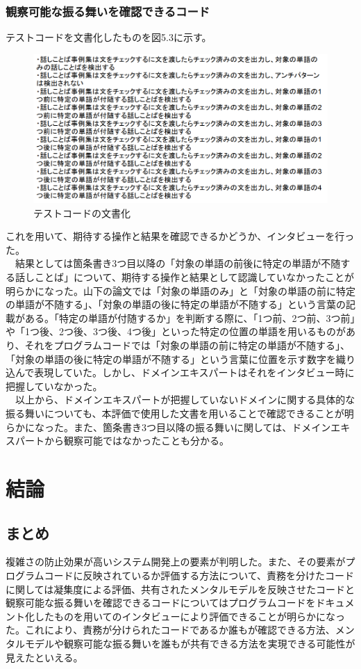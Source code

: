 \documentclass[12pt, a4paper]{jreport}
\begin{document}
\subsection{観察可能な振る舞いを確認できるコード}
テストコードを文書化したものを図5.3に示す。
\begin{figure}[H]
\centering
\includegraphics[width=1\linewidth]{image/hurumai.png}
\caption{テストコードの文書化}
\label{fig:enter-label}
\end{figure}
これを用いて、期待する操作と結果を確認できるかどうか、インタビューを行った。
\\　結果としては箇条書き3つ目以降の「対象の単語の前後に特定の単語が不随する話しことば」について、期待する操作と結果として認識していなかったことが明らかになった。山下の論文では「対象の単語のみ」と「対象の単語の前に特定の単語が不随する」、「対象の単語の後に特定の単語が不随する」という言葉の記載がある。「特定の単語が付随するか」を判断する際に、「1つ前、2つ前、3つ前」や「1つ後、2つ後、3つ後、4つ後」といった特定の位置の単語を用いるものがあり、それをプログラムコードでは「対象の単語の前に特定の単語が不随する」、「対象の単語の後に特定の単語が不随する」という言葉に位置を示す数字を織り込んで表現していた。しかし、ドメインエキスパートはそれをインタビュー時に把握していなかった。
\\　以上から、ドメインエキスパートが把握していないドメインに関する具体的な振る舞いについても、本評価で使用した文書を用いることで確認できることが明らかになった。また、箇条書き3つ目以降の振る舞いに関しては、ドメインエキスパートから観察可能ではなかったことも分かる。
\chapter{結論}
\section{まとめ}
複雑さの防止効果が高いシステム開発上の要素が判明した。また、その要素がプログラムコードに反映されているか評価する方法について、責務を分けたコードに関しては凝集度による評価、共有されたメンタルモデルを反映させたコードと観察可能な振る舞いを確認できるコードについてはプログラムコードをドキュメント化したものを用いてのインタビューにより評価できることが明らかになった。これにより、責務が分けられたコードであるか誰もが確認できる方法、メンタルモデルや観察可能な振る舞いを誰もが共有できる方法を実現できる可能性が見えたといえる。
\end{document}
